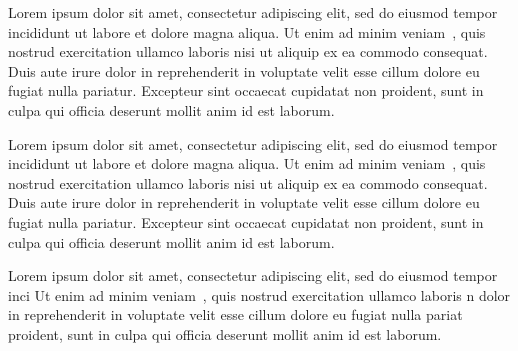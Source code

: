 \documentclass[a4paper, 12pt, twoside]{article}
\begin{document}
Lorem ipsum dolor sit amet, consectetur adipiscing elit, sed do eiusmod tempor incididunt ut labore et dolore magna aliqua. 
Ut enim ad minim veniam~\cite{raschka}, quis nostrud exercitation ullamco laboris nisi ut aliquip\cite{jquery} ex ea commodo consequat. Duis aute irure\cite{date1987guide}
dolor in reprehenderit\cite{miller2010apache} in voluptate velit esse cillum dolore eu fugiat nulla\cite{patel2013incremental} pariatur. Excepteur sint\cite{reactjs} occaecat cupidatat non 
proident, sunt in culpa qui officia deserunt mollit anim id est laborum.

Lorem ipsum\cite{brockman2016openai} dolor sit amet\cite{chacon2014pro}, consectetur adipiscing elit, sed\cite{duckett2011html} do eiusmod tempor incididunt ut labore et dolore magna aliqua. 
Ut enim ad minim veniam~\cite{strona}, quis nostrud exercitation ullamco laboris nisi ut aliquip ex ea commodo consequat. Duis aute irure 
dolor in reprehenderit in\cite{flanagan2006javascript} voluptate velit esse cillum dolore eu fugiat nulla pariatur\cite{github}. Excepteur sint occaecat\cite{hibernate} cupidatat non 
proident, sunt in culpa\cite{bootstrap} qui officia deserunt mollit anim id est laborum.

                                 
Lorem ipsum\cite{arnold2005java} dolor sit amet, consectetur adipiscing elit, sed do eiusmod tempor inci
Ut enim ad minim veniam~\cite{scikit-learn}, quis nostrud exercitation ullamco\cite{springboot} laboris n
dolor in reprehenderit in voluptate velit esse cillum dolore eu fugiat nulla\cite{spring} pariat~\cite{blabla, CitekeyInbook, CitekeyIncollection}
proident, sunt in culpa qui officia deserunt mollit anim id est laborum.

\printbibliography{}
\end{document}
